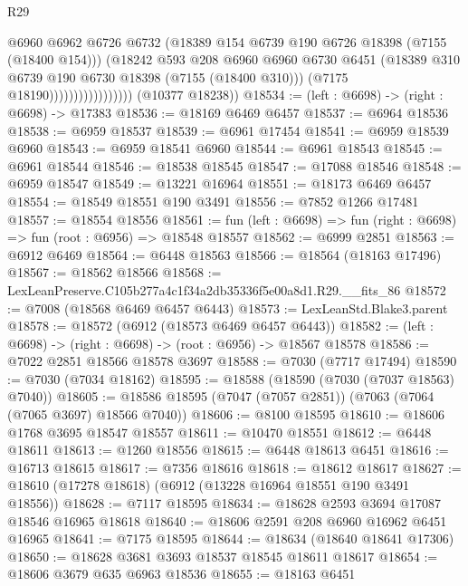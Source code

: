 \begin{lexlean}{R29}
\begin{coremodule}
                                    @6960
                                    @6962
                                    @6726
                                    @6732
                                    (@18389 @154 @6739 @190 @6726 @18398 (@7155 (@18400 @154)))
                                    (@18242
                                      @593
                                      @208
                                      @6960
                                      @6960
                                      @6730
                                      @6451
                                      (@18389 @310 @6739 @190 @6730 @18398 (@7155 (@18400 @310)))
                                      (@7175 @18190)))))))))))))))))
      (@10377 @18238))
@18534 := (left : @6698) -> (right : @6698) -> @17383
@18536 := @18169 @6469 @6457
@18537 := @6964 @18536
@18538 := @6959 @18537
@18539 := @6961 @17454
@18541 := @6959 @18539 @6960
@18543 := @6959 @18541 @6960
@18544 := @6961 @18543
@18545 := @6961 @18544
@18546 := @18538 @18545
@18547 := @17088 @18546
@18548 := @6959 @18547
@18549 := @13221 @16964
@18551 := @18173 @6469 @6457
@18554 := @18549 @18551 @190 @3491
@18556 := @7852 @1266 @17481
@18557 := @18554 @18556
@18561 := fun (left : @6698) => fun (right : @6698) => fun (root : @6956) => @18548 @18557
@18562 := @6999 @2851
@18563 := @6912 @6469
@18564 := @6448 @18563
@18566 := @18564 (@18163 @17496)
@18567 := @18562 @18566
@18568 := LexLeanPreserve.C105b277a4c1f34a2db35336f5e00a8d1.R29.__fits_86
@18572 := @7008 (@18568 @6469 @6457 @6443)
@18573 := LexLeanStd.Blake3.parent
@18578 := @18572 (@6912 (@18573 @6469 @6457 @6443))
@18582 := (left : @6698) -> (right : @6698) -> (root : @6956) -> @18567 @18578
@18586 := @7022 @2851 @18566 @18578 @3697
@18588 := @7030 (@7717 @17494)
@18590 := @7030 (@7034 @18162)
@18595 := @18588 (@18590 (@7030 (@7037 @18563) @7040))
@18605 := @18586 @18595 (@7047 (@7057 @2851)) (@7063 (@7064 (@7065 @3697) @18566 @7040))
@18606 := @8100 @18595
@18610 := @18606 @1768 @3695 @18547 @18557
@18611 := @10470 @18551
@18612 := @6448 @18611
@18613 := @1260 @18556
@18615 := @6448 @18613 @6451
@18616 := @16713 @18615
@18617 := @7356 @18616
@18618 := @18612 @18617
@18627 := @18610 (@17278 @18618) (@6912 (@13228 @16964 @18551 @190 @3491 @18556))
@18628 := @7117 @18595
@18634 := @18628 @2593 @3694 @17087 @18546 @16965 @18618
@18640 := @18606 @2591 @208 @6960 @16962 @6451 @16965
@18641 := @7175 @18595
@18644 := @18634 (@18640 @18641 @17306)
@18650 := @18628 @3681 @3693 @18537 @18545 @18611 @18617
@18654 := @18606 @3679 @635 @6963 @18536
@18655 := @18163 @6451

\end{coremodule}
\end{lexlean}
